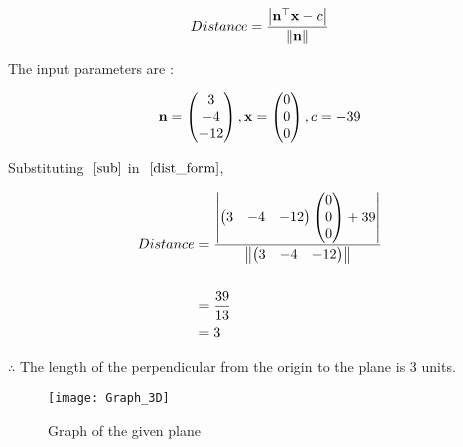 \documentclass[journal,12pt,twocolumn]{IEEEtran}
\begin{document}
	\begin{align}
		Distance = \frac{\left\vert\mathbf{n}^\top \mathbf{x} - c\right\vert}{\left\lVert\mathbf{n}\right\rVert}
			\label{dist_form}
	\end{align}
	
	
	The input parameters are :
	
	\begin{align}
		\mathbf{n} = \begin{pmatrix}3 \\ -4 \\ -12\end{pmatrix},
		\mathbf{x} = \begin{pmatrix}0 \\ 0 \\ 0\end{pmatrix},
		c = -39
			\label{sub}
	\end{align}
	
	
	Substituting $~\eqref{sub}$ in $~\eqref{dist_form}$,
	
	\begin{align}
		Distance &= \frac{\left\vert\begin{pmatrix}3 & -4 & -12\end{pmatrix} \begin{pmatrix}0 \\ 0 \\ 0\end{pmatrix} + 39\right\vert}{\left\lVert\begin{pmatrix}3 & -4 & -12\end{pmatrix}\right\rVert}  \\
				\nonumber\\
				&= \frac{39}{13} \\
				&= 3
	\end{align}
		
		
	$\therefore$ The length of the perpendicular from the origin to the plane  is \underline{$3$} units.


	\begin{figure}[h!]
		\centering
		\texttt{[image: Graph\_3D]}
		\caption{Graph of the given plane}
	\end{figure}
\end{document}
